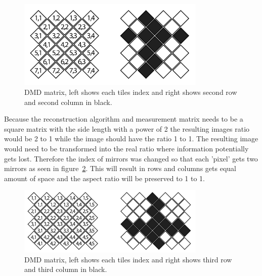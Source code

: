 \begin{figure}[H]
    \centering
    \includegraphics[width = 0.8\textwidth]{gfx/DMD_grid.png}
    \caption{DMD matrix, left shows each tiles index and right shows second row and second column in black.}
    \label{fig:dmd_index}
\end{figure}

Because the reconstruction algorithm and measurement matrix needs to be a square matrix with the side length with a power of 2 the resulting images ratio would be 2 to 1 while the image should have the ratio 1 to 1. The resulting image would need to be transformed into the real ratio where information potentially gets lost. Therefore the index of mirrors was changed so that each 'pixel' gets two mirrors as seen in figure~\ref{fig:dmd_index2}. This will result in rows and columns gets equal amount of space and the aspect ratio will be preserved to 1 to 1. 

\begin{figure}[H]
    \centering
    \includegraphics[width = 0.8\textwidth]{gfx/DMD_grid2.png}
    \caption{DMD matrix, left shows each tiles index and right shows third row and third column in black.}
    \label{fig:dmd_index2}
\end{figure}



